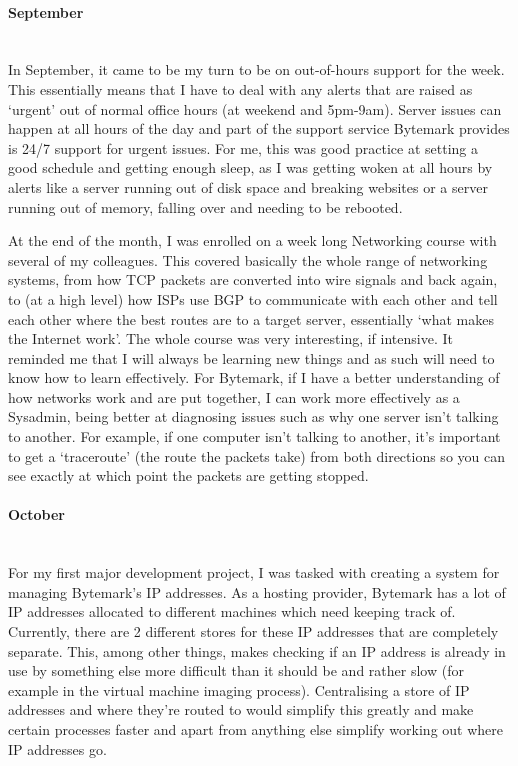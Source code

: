 \documentclass[12pt,a4paper]{article}
\newcommand{\paragraphnl}[1]{\paragraph{#1}\mbox{}\\}
\begin{document}
\paragraphnl{September}
	In September, it came to be my turn to be on out-of-hours support for the
	week. This essentially means that I have to deal with any alerts that are
	raised as `urgent' out of normal office hours (at weekend and 5pm-9am).
	Server issues can happen at all hours of the day and part of the support
	service Bytemark provides is 24/7 support for urgent issues. For me, this
	was good practice at setting a good schedule and getting enough sleep, as I
	was getting woken at all hours by alerts like a server running out of disk
	space and breaking websites or a server running out of memory, falling over
	and needing to be rebooted.

	At the end of the month, I was enrolled on a week long Networking course
	with several of my colleagues. This covered basically the whole range of
	networking systems, from how TCP packets are converted into wire signals
	and back again, to (at a high level) how ISPs use BGP to communicate with
	each other and tell each other where the best routes are to a target
	server, essentially `what makes the Internet work'. The whole course was
	very interesting, if intensive. It reminded me that I will always be
	learning new things and as such will need to know how to learn effectively.
	For Bytemark, if I have a better understanding of how networks work and are
	put together, I can work more effectively as a Sysadmin, being better at
	diagnosing issues such as why one server isn't talking to another. For
	example, if one computer isn't talking to another, it's important to get a
	`traceroute' (the route the packets take) from both directions so you can
	see exactly at which point the packets are getting stopped.

\paragraphnl{October}
	For my first major development project, I was tasked with creating a system
	for managing Bytemark's IP addresses. As a hosting provider, Bytemark has a
	lot of IP addresses allocated to different machines which need keeping
	track of. Currently, there are 2 different stores for these IP addresses
	that are completely separate. This, among other things, makes checking if
	an IP address is already in use by something else more difficult than it
	should be and rather slow (for example in the virtual machine imaging
	process). Centralising a store of IP addresses and where they're routed to
	would simplify this greatly and make certain processes faster and apart
	from anything else simplify working out where IP addresses go.
\end{document}
